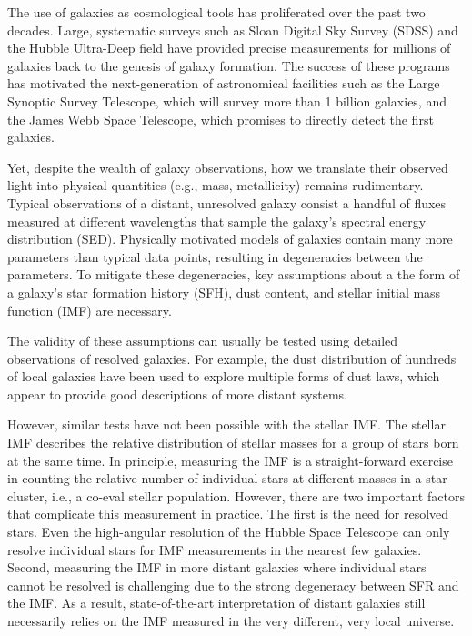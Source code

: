 \documentclass[11pt,preprint]{aastex}
\begin{document}
The use of galaxies as cosmological tools has proliferated over the past two decades.  Large, systematic surveys such as Sloan Digital Sky Survey (SDSS) and the Hubble Ultra-Deep field have provided precise measurements for millions of galaxies back to the genesis of galaxy formation.  The success of these programs has motivated the next-generation of astronomical facilities such as the Large Synoptic Survey Telescope, which will survey more than 1 billion galaxies, and the James Webb Space Telescope, which promises to directly detect the first galaxies.

Yet, despite the wealth of galaxy observations, how we translate their observed light into physical quantities (e.g., mass, metallicity) remains rudimentary.  Typical observations of a distant, unresolved galaxy consist a handful of fluxes measured at different wavelengths that sample the galaxy's spectral energy distribution (SED).  Physically motivated models of galaxies contain many more parameters than typical data points, resulting in degeneracies between the parameters. To mitigate these degeneracies, key assumptions about a the form of a galaxy's star formation history (SFH), dust content, and stellar initial mass function (IMF) are necessary.  

The validity of these assumptions can usually be tested using detailed observations of resolved galaxies.  For example, the dust distribution of hundreds of local galaxies have been used to explore multiple forms of dust laws, which appear to provide good descriptions of more distant systems.

However, similar tests have not been possible with the stellar IMF.  The stellar IMF describes the relative distribution of stellar masses for a group of stars born at the same time.  In principle, measuring the IMF is a straight-forward exercise in counting the relative number of individual stars at different masses in a star cluster, i.e., a co-eval stellar population.  However, there are two important factors that complicate this measurement in practice.  The first is the need for resolved stars.  Even the high-angular resolution of the Hubble Space Telescope can only resolve individual stars for IMF measurements in the nearest few galaxies.  Second, measuring the IMF in more distant galaxies where individual stars cannot be resolved is challenging due to the strong degeneracy between SFR and the IMF.  As a result, state-of-the-art interpretation of distant galaxies still necessarily relies on the IMF measured in the very different, very local universe.
\end{document}
